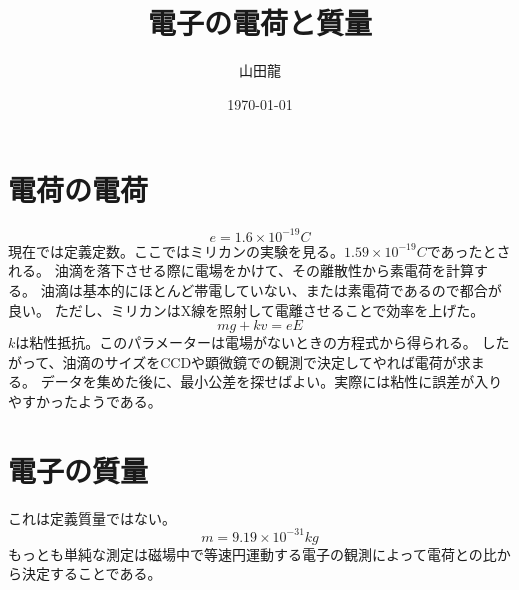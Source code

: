 \documentclass{jsarticle}
\date{\today}
\author{山田龍}
\title{電子の電荷と質量}
\newcommand{\beq}{\begin{equation}}
\newcommand{\eeq}{\end{equation}}
\begin{document}
\maketitle
\section{電荷の電荷}
\beq
    e = 1.6 \times 10^{-19} C
\eeq
現在では定義定数。ここではミリカンの実験を見る。$1.59\times 10^{-19}C$であったとされる。
油滴を落下させる際に電場をかけて、その離散性から素電荷を計算する。
油滴は基本的にほとんど帯電していない、または素電荷であるので都合が良い。
ただし、ミリカンはX線を照射して電離させることで効率を上げた。
\beq
 mg + kv = eE
\eeq
$k$は粘性抵抗。このパラメーターは電場がないときの方程式から得られる。
したがって、油滴のサイズをCCDや顕微鏡での観測で決定してやれば電荷が求まる。
データを集めた後に、最小公差を探せばよい。実際には粘性に誤差が入りやすかったようである。
\section{電子の質量}
これは定義質量ではない。
\beq
    m = 9.19 \times 10^{-31} kg
\eeq
もっとも単純な測定は磁場中で等速円運動する電子の観測によって電荷との比から決定することである。
\end{document}
